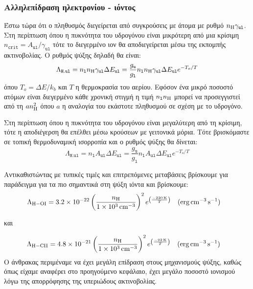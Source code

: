 \subsubsection{Αλληλεπίδραση ηλεκτρονίου - ιόντος}
Έστω τώρα ότι ο πληθυσμός διεγείρεται από συγκρούσεις με άτομα  με ρυθμό $n_{\ce{H}}\gamma _\mathtt{ul}$. Στη περίπτωση όπου η πυκνότητα του υδρογόνου είναι μικρότερη από μια κρίσιμη $n_\mathtt{crit}=A_\mathtt{ul}/\gamma _\mathtt{ul}$ τότε το διεγερμένο ιον θα αποδιεγείρεται μέσω της εκπομπής ακτινοβολίας. Ο ρυθμός ψύξης δηλαδή θα είναι:
\begin{equation}
\Lambda _\mathtt{H.ul} = n_\mathtt{l} n_{\ce{H}} \gamma _\mathtt{ul} \Delta E _\mathtt{ul} = \frac{g_\mathtt{u}}{g_\mathtt{l}} n_\mathtt{l} n_{\ce{H}} \gamma _\mathtt{ul} \Delta E_\mathtt{ul} e^{-T_o/T}
\end{equation}
όπου $T_o=\Delta E/k_b$ και $T$ η θερμοκρασία του αερίου. Εφόσον ένα μικρό ποσοστό ατόμων είναι διεγερμένο κάθε χρονική στιγμή η τιμή $ n_\mathtt{l} n_{\ce{H}} $ μπορεί να προσεγγιστεί από τη $a n_{\ce{H}}^2$ όπου $a$ η αναλογία του εκάστοτε πληθυσμού σε σχέση με το υδρογόνο.

Στη περίπτωση όπου η πυκνότητα του υδρογόνου είναι μεγαλύτερη από τη κρίσιμη, τότε η αποδιέγερση θα
επέλθει μέσω κρούσεων με γειτονικά μόρια. Τότε βρισκόμαστε σε τοπική θερμοδυναμική ισορροπία και ο ρυθμός ψύξης θα δίνεται:
\begin{equation}
\Lambda _\mathtt{H.ul} = n_\mathtt{l}  A _\mathtt{ul} \Delta E _\mathtt{ul} = \frac{g_\mathtt{u}}{g_\mathtt{l}} n_\mathtt{l} A _\mathtt{ul} \Delta E_\mathtt{ul} e^{-T_o/T}
\end{equation}
 
Αντικαθιστώντας με τυπικές τιμές και επιτρεπόμενες μεταβάσεις βρίσκουμε για παράδειγμα για τα πιο σημαντικά στη ψύξη ιόντα  και  βρίσκουμε:
\begin{equation}
\Lambda _{\ce{H - OI}}=\num{3.2e-22} \left( \frac{n_{\ce{H}}}{\SI{1e3}{cm^{-3}}} \right)^2 e^{\left( \frac{\SI{-230}{K}}{T} \right) } \qq{(\si{erg.cm^{-3}.s^{-1}})} 
\end{equation}

και

\begin{equation}
\Lambda _{\ce{H - CII}}=\num{4.8e-21} \left( \frac{n_{\ce{H}}}{\SI{1e3}{cm^{-3}}} \right)^2 e^{\left( \frac{\SI{-92}{K}}{T} \right) } \qq{(\si{erg.cm^{-3}.s^{-1}})} 
\end{equation}
Ο άνθρακας περιμέναμε να έχει μεγάλη επίδραση στους μηχανισμούς ψύξης, καθώς όπως είχαμε αναφέρει στο προηγούμενο κεφάλαιο, έχει μεγάλο ποσοστό ιονισμού λόγω της απορρόφησης της υπεριώδους ακτινοβολίας.

